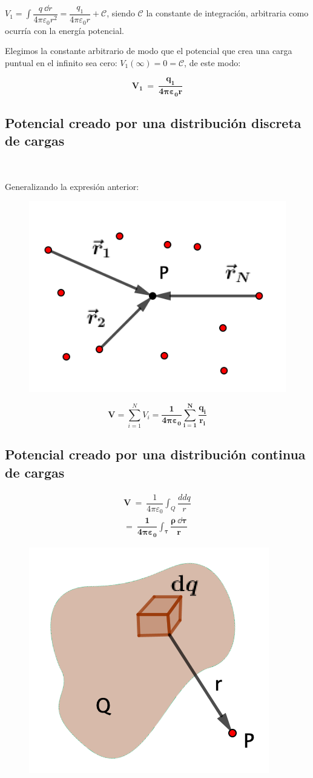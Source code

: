 \normalsize{$V_1=\displaystyle \int \dfrac{q \ \dd r}{4	\pi \varepsilon_0 r^2}=\dfrac{q_1}{4	\pi \varepsilon_0 r} + \mathcal C$, siendo $\mathcal C$ la constante de integración, arbitraria como ocurría con la energía potencial.}

Elegimos la constante arbitrario de modo que el potencial que crea una carga puntual en el infinito sea cero: $V_1(\infty)=0=\mathcal C$, de este modo:

\begin{equation}
\boldsymbol{V_1 \ = \ \dfrac{q_1}{4	\pi \varepsilon_0 r}}	
\end{equation}

\subsection{Potencial creado por una distribución discreta de cargas}

\begin{multicols}{2}

$\quad$

Generalizando la expresión anterior:


\begin{figure}[H]
		\centering
		\includegraphics[width=.3\textwidth]{imagenes/imagenes22/T22IM08.png}
	\end{figure}	
\end{multicols}

\begin{equation}
\boldsymbol{ V=}\sum_{i=1}^N V_i = \boldsymbol{ \dfrac {1}{4\pi \varepsilon_0} \sum_{i=1}^N \dfrac {q_i}{r_i} }
\end{equation}

\subsection{Potencial creado por una distribución continua de cargas}

\begin{multicols}{2}
\begin{eqnarray}
\boldsymbol{V\ =}\ \dfrac {1}{4\pi \varepsilon_0}\int_Q \dfrac{dd q}{r}   \nonumber \\
\boldsymbol{=\ \dfrac {1}{4\pi \varepsilon_0} \int_\tau \dfrac{\rho \ \dd \tau}{r}} 	
\end{eqnarray}
\begin{figure}[H]
		\centering
		\includegraphics[width=.25\textwidth]{imagenes/imagenes22/T22IM09.png}
	\end{figure}	
\end{multicols}


